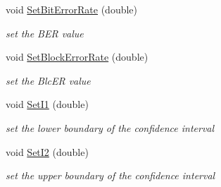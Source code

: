 \begin{DoxyCompactItemize}
void \hyperlink{classns3_1_1SNRToBlockErrorRateRecord_afaa5b95b6d4ce0e9fc1024cbf00ba5ea}{Set\+Bit\+Error\+Rate} (double)
\begin{DoxyCompactList}\small\item\em set the B\+ER value \end{DoxyCompactList}\item 
void \hyperlink{classns3_1_1SNRToBlockErrorRateRecord_a791b51fc9a8d70b56918d6c40e3fa47f}{Set\+Block\+Error\+Rate} (double)
\begin{DoxyCompactList}\small\item\em set the Blc\+ER value \end{DoxyCompactList}\item 
void \hyperlink{classns3_1_1SNRToBlockErrorRateRecord_a0b86bd6103017be99e5627b81e0c76ac}{Set\+I1} (double)
\begin{DoxyCompactList}\small\item\em set the lower boundary of the confidence interval \end{DoxyCompactList}\item 
void \hyperlink{classns3_1_1SNRToBlockErrorRateRecord_ac0a260542eadbf1b26a8a564418c98d7}{Set\+I2} (double)
\begin{DoxyCompactList}\small\item\em set the upper boundary of the confidence interval \end{DoxyCompactList}\end{DoxyCompactItemize}
